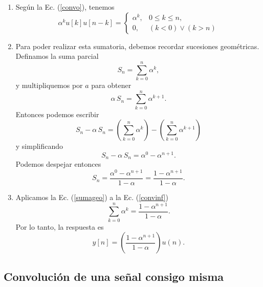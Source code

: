\begin{enumerate}
\item Seg\'{u}n la Ec. (\ref{convo}), tenemos
  \begin{equation}
    \alpha^{k} u[k] u[n-k] =
    \left\{ \begin{array}{ll}
        \alpha ^{k}, & 0\leq k\leq n, \\ 
        0, & \left( k<0\right) \vee \left( k>n\right)
      \end{array} \right.             \label{convinf}
  \end{equation}

\item Para poder realizar esta sumatoria, debemos recordar sucesiones
  geométricas.  Definamos la suma parcial
  \begin{equation}
    S_{n}=    \sum_{k=0}^n\alpha ^{k},
  \end{equation}
  y multipliquemos por $a$ para obtener
  \begin{equation}
    \alpha \, S_{n}=   \sum_{k=0}^n\alpha ^{k+1}.
  \end{equation}
  Entonces podemos escribir
  \begin{equation}
    S_{n}-\alpha \, S_{n}= \left( \sum_{k=0}^n\alpha ^{k}\right) - \left( \sum_{k=0}^n\alpha ^{k+1}\right)
  \end{equation}
  y simplificando
  \begin{equation}
    S_n- \alpha \, S_n=\alpha^{0}-\alpha^{n+1}.
  \end{equation}
  Podemos despejar entonces
  \begin{equation}
    S_n=\frac{\alpha^{0}-\alpha^{n+1}}{1-\alpha}=\frac{1-\alpha^{n+1}}{1-\alpha}.    \label{sumageo}
  \end{equation}

\item Aplicamos la Ec. (\ref{sumageo}) a la Ec. (\ref{convinf})
  \begin{equation}
    \sum_{k=0}^n\alpha ^{k}=\frac{1-\alpha ^{n+1}}{1-\alpha }.      \label{sumaserie}
  \end{equation}
  Por lo tanto, la respuesta es
  \begin{equation}
    y\left[ n\right] =\left( \frac{1-\alpha ^{n+1}}{1-\alpha }\right) u\left(n\right) .
  \end{equation}
\end{enumerate}

\subsection{Convoluci\'{o}n de una se\~{n}al consigo misma}

